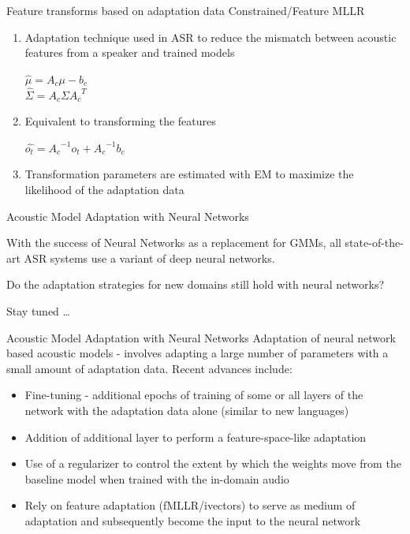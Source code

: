 \begin{frame}{Feature transforms based on adaptation data}
\alert{Constrained/Feature MLLR}
        \begin{enumerate}
        \item Adaptation technique used in ASR to reduce the mismatch between acoustic
        features from a speaker and trained models \\
        \begin{center}
                $\hat{\mu} = A_c\mu - b_c$\\
                $\hat{\Sigma} = A_c \Sigma {A_c}^T$
        \end{center}
        \item Equivalent to transforming the features \\
        \begin{center}
                $\hat{o_t} = {A_c}^{-1}o_t + {A_c}^{-1}b_c$
        \end{center}
        \item Transformation parameters are estimated with EM to maximize the
        likelihood of the adaptation data
        \end{enumerate}
\end{frame}


\begin{frame} {Acoustic Model Adaptation with Neural Networks}

With the success of Neural Networks as a replacement for GMMs, all state-of-the-art ASR systems use a variant of deep neural networks.

Do the adaptation strategies for new domains still hold with neural networks? \pause

Stay tuned \ldots

\end{frame}

\begin{frame} {Acoustic Model Adaptation with Neural Networks}
\alert{Adaptation of neural network based acoustic models} - involves adapting a large number of parameters with a small amount of adaptation data. Recent advances include:
        \begin{itemize}
        \item \alert{Fine-tuning} - additional epochs of training of some or all layers of the network with the adaptation data alone (similar to new languages)
        \item \alert{Addition of additional layer} to perform a feature-space-like adaptation
        \item Use of a \alert{regularizer} to control the extent by which the weights move from the baseline model when trained with the in-domain audio
        \item Rely on \alert{feature adaptation} (fMLLR/ivectors) to serve as medium of adaptation and subsequently become the input to the neural network
        \end{itemize}
\end{frame}

